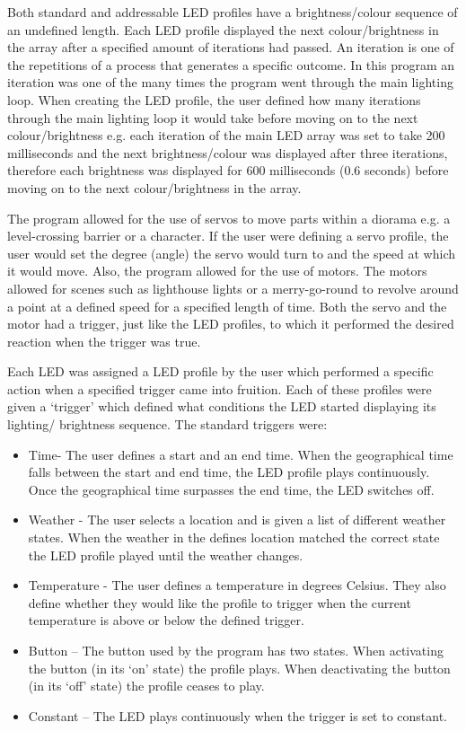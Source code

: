 Both standard and addressable LED profiles have a brightness/colour sequence of an undefined length. Each LED profile displayed the next colour/brightness in the array after a specified amount of iterations had passed. An iteration is one of the repetitions of a process that generates a specific outcome. In this program an iteration was one of the many times the program went through the main lighting loop. When creating the LED profile, the user defined how many iterations through the main lighting loop it would take before moving on to the next colour/brightness e.g. each iteration of the main LED array was set to take 200 milliseconds and the next brightness/colour was displayed after three iterations, therefore each brightness was displayed for 600 milliseconds (0.6 seconds) before moving on to the next colour/brightness in the array. 

The program allowed for the use of servos to move parts within a diorama e.g. a level-crossing barrier or a character. If the user were defining a servo profile, the user would set the degree (angle) the servo would turn to and the speed at which it would move. Also, the program allowed for the use of motors. The motors allowed for scenes such as lighthouse lights or a merry-go-round to revolve around a point at a defined speed for a specified length of time. Both the servo and the motor had a trigger, just like the LED profiles, to which it performed the desired reaction when the trigger was true.

Each LED was assigned a LED profile by the user which performed a specific action when a specified trigger came into fruition. Each of these profiles were given a ‘trigger’ which defined what conditions the LED started displaying its lighting/ brightness sequence. The standard triggers were:
\begin{itemize}
\item Time- The user defines a start and an end time. When the geographical time falls between the start and end time, the LED profile plays continuously. Once the geographical time surpasses the end time, the LED switches off.
\item Weather - The user selects a location and is given a list of different weather states. When the weather in the defines location matched the correct state the LED profile played until the weather changes.
\item Temperature - The user defines a temperature in degrees Celsius. They also define whether they would like the profile to trigger when the current temperature is above or below the defined trigger. 
\item Button – The button used by the program has two states. When activating the button (in its ‘on’ state) the profile plays. When deactivating the button (in its ‘off’ state) the profile ceases to play. 
\item Constant – The LED plays continuously when the trigger is set to constant.
\end {itemize}

